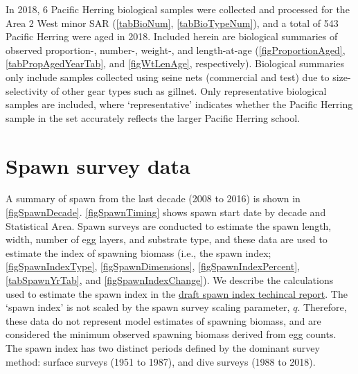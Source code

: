 \documentclass[12pt]{article}\usepackage[]{graphicx}\usepackage[]{color}
\newcommand{\regionName}{Area 2 West}
\newcommand{\regionType}{minor}
\newcommand{\thisYr}{2018}
\newcommand{\fishName}{Pacific Herring}
\newcommand{\seineSamples}{Biological summaries only include samples collected using seine nets (commercial and test) due to size-selectivity of other gear types such as gillnet.}
\newcommand{\repSamples}{Only representative biological samples are included, where `representative' indicates whether the \fishName{} sample in the set accurately reflects the larger \fishName{} school.}
\newcommand{\spawnIndex}{The `spawn index' is not scaled by the spawn survey scaling parameter, $q$.}
\newcommand{\qPeriods}{The spawn index has two distinct periods defined by the dominant survey method: surface surveys (1951 to 1987), and dive surveys (1988 to 2018).}
\begin{document}
In \thisYr{}, 6 \fishName{} biological samples were collected and processed for the \regionName{} \regionType{} SAR (\autoref{tabBioNum}, \autoref{tabBioTypeNum}), and a total of 543 \fishName{} were aged in \thisYr{}. 
\iftoggle{numPropWtAge}{Differences between biological data collected from two sampling protocols regarding the number-, proportion-, weight-, and length-at-age for \fishName{} in \thisYr{} in the \regionName{} \regionType{} SAR are shown in \autoref{tabDeltaNumAgeYr}, \autoref{tabDeltaPropAgeYr}, \autoref{tabDeltaWtAgeYr}, and \autoref{tabDeltaLenAgeYr}, respectively.
The nearshore sampling program is a multi-year pilot study (using cast nets), therefore only biological data from the seine samples were used for the purposes of stock assessment.}{\unskip}
\iftoggle{biosamples}{The locations in which the biological samples were collected are presented in \autoref{figBioLocations}.}{\unskip}
\iftoggle{weightCatch}{Biological samples collected using seine gear shows that there is considerable variability in fish weight by year and sample type (\autoref{figWeightCatch}).}{\unskip}
Included herein are biological summaries of observed proportion-, number-, weight-, and length-at-age (\autoref{figProportionAged}, \autoref{tabPropAgedYearTab}, and \autoref{figWtLenAge}, respectively).
\iftoggle{weightGroup}{Some Statistical Areas tend to have larger fish at a given age (\autoref{figWeightAgeGroup}, \autoref{tabWeightAgeGroupN}).}{\unskip}
\seineSamples{}
\repSamples{}

\section{Spawn survey data}

\iftoggle{spawnByLoc}{\fishName{} spawn surveys were conducted at 3 individual locations in \thisYr{} in the \regionName{} \regionType{} SAR (\autoref{tabSpawnByLoc}\iftoggle{spawnByLocXY}{, and \autoref{figSpawnByLoc}}{\unskip}).}
{No spawn surveys were conducted in \thisYr{} in the \regionName{} \regionType{} SAR.}
A summary of spawn from the last decade (2008 to 2016) is shown in \autoref{figSpawnDecade}.
\autoref{figSpawnTiming} shows spawn start date by decade and Statistical Area.
Spawn surveys are conducted to estimate the spawn length, width, number of egg layers, and substrate type, and these data are used to estimate the index of spawning biomass (i.e., the spawn index; \autoref{figSpawnIndexType}, \autoref{figSpawnDimensions}, \autoref{figSpawnIndexPercent}, \autoref{tabSpawnYrTab}, and \autoref{figSpawnIndexChange}).
We describe the calculations used to estimate the spawn index in the \href{https://github.com/grinnellm/HerringSpawnDocumentation/blob/master/SpawnIndexTechnicalReport.pdf}{draft spawn index techincal report}.
\iftoggle{spawnDepth}{In addition, spawn surveys estimate spawn depth by Statistical Area, and Section (\autoref{figSpawnDepth}).}{\unskip}
\spawnIndex{}
Therefore, these data do not represent model estimates of spawning biomass, and are considered the minimum observed spawning biomass derived from egg counts.
\qPeriods{}
\end{document}
